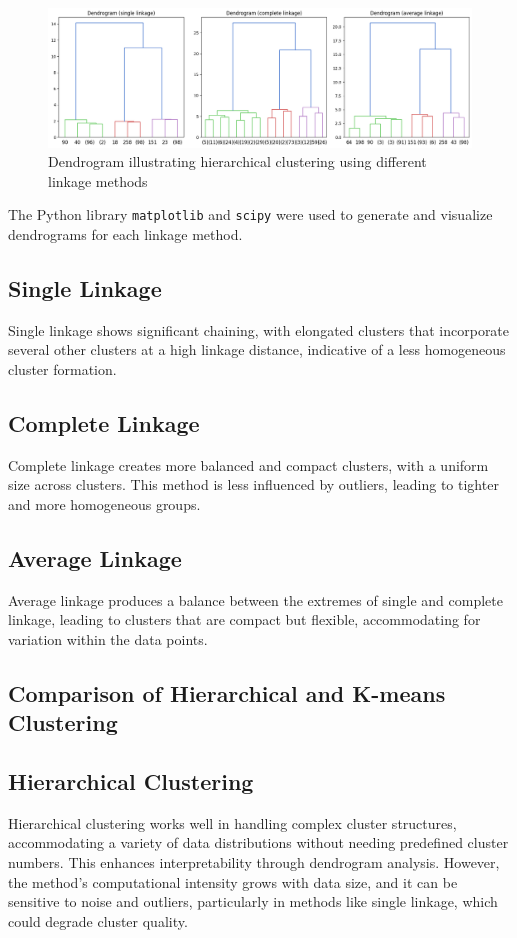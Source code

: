 \documentclass[11pt,a4paper]{article}
\begin{document}
\begin{figure}[ht]
    \centering
    \includegraphics[width=1\textwidth]{images/dendrogram.png}
    \caption{Dendrogram illustrating hierarchical clustering using different linkage methods}
    \label{fig:dendrogram}
\end{figure}

\noindent The Python library \texttt{matplotlib} and \texttt{scipy} were used to generate and visualize dendrograms for each linkage method.

\subsection*{Single Linkage}
Single linkage shows significant chaining, with elongated clusters that incorporate several
other clusters at a high linkage distance, indicative of a less homogeneous cluster formation.

\subsection*{Complete Linkage}
Complete linkage creates more balanced and compact clusters, with a uniform size across
clusters. This method is less influenced by outliers, leading to tighter and more homogeneous groups.

\subsection*{Average Linkage}
Average linkage produces a balance between the extremes of single and complete linkage,
leading to clusters that are compact but flexible, accommodating for variation within the data points.

\subsection{Comparison of Hierarchical and K-means Clustering}

\subsection*{Hierarchical Clustering}
Hierarchical clustering works well in handling complex cluster structures, accommodating a variety of data distributions without needing predefined cluster numbers.
This enhances interpretability through dendrogram analysis. However, the method's computational intensity grows with data size, and it can be sensitive
to noise and outliers, particularly in methods like single linkage, which could degrade cluster quality.
\end{document}
